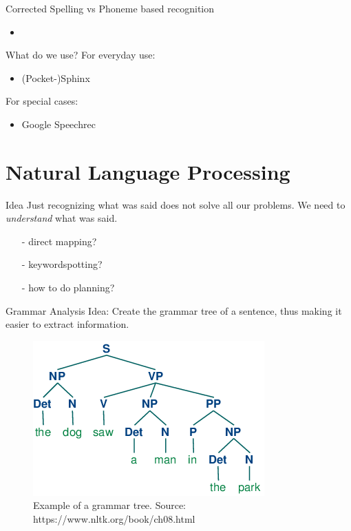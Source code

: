 \documentclass{beamer}
\begin{document}
	\begin{frame}{Corrected Spelling vs Phoneme based recognition}
		\begin{itemize}
			\item 
		\end{itemize}
	\end{frame}
	\begin{frame}{What do we use?}
		For everyday use:
		\pause
		\begin{itemize}
			\item (Pocket-)Sphinx
		\end{itemize}
		
		For special cases:
		\pause
		\begin{itemize}
			\item Google Speechrec
		\end{itemize}
	\end{frame}
	
	\section{Natural Language Processing}%
	
	\begin{frame}{Idea}
		Just recognizing what was said does not solve all our problems. We need to \emph{understand} what was said.
		\pause
		\begin{itemize}
			\item[-] direct mapping?
			\pause
			\item[-] keywordspotting?
			\pause
			\item[-] how to do planning?
		\end{itemize}
	\end{frame}
	
	\begin{frame}{Grammar Analysis}
		Idea: Create the grammar tree of a sentence, thus making it easier to extract information.
		
		\begin{figure}[ht]
			\centering
			\includegraphics[width=.7\linewidth]{Bilder/grammar_tree.png}
			\caption{Example of a grammar tree. Source: https://www.nltk.org/book/ch08.html}
		\end{figure}
		
	\end{frame}
	
\end{document}
